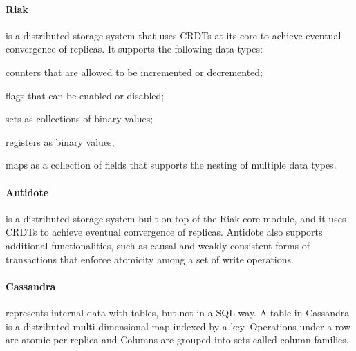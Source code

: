 	\paragraph{Riak}is a distributed storage system that uses CRDTs at its core to achieve eventual convergence of replicas. It supports the following data types:
	\begin{enumerate*}[(i)]
	\item counters  that are allowed to be incremented or decremented;
	
	\item flags that can be enabled or disabled;
	
	\item sets as collections of binary values;
	
	\item registers as binary values;
	
	\item maps as a collection of fields that supports the nesting of multiple data types.
	\end{enumerate*}	
	
	\paragraph{Antidote}is a distributed storage system built on top of the Riak core module, and it uses CRDTs to achieve eventual convergence of replicas. Antidote also supports additional functionalities, such as causal and weakly consistent forms of transactions that enforce atomicity among a set of write operations.
	
	\paragraph{Cassandra} represents internal data with tables, but not in a SQL way. A table in Cassandra is a distributed multi dimensional map indexed by a key. Operations under a row are atomic per replica and Columns are grouped into sets called column families.\par
	
